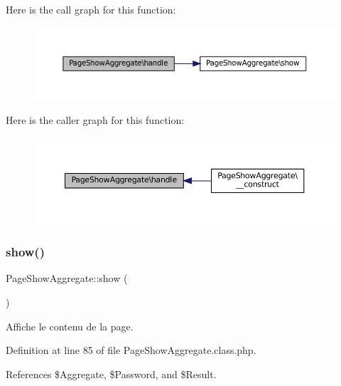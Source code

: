 Here is the call graph for this function\+:\nopagebreak
\begin{figure}[H]
\begin{center}
\leavevmode
\includegraphics[width=350pt]{class_page_show_aggregate_afc4bd6c13d8f52ef14bb372abe533db2_cgraph}
\end{center}
\end{figure}
Here is the caller graph for this function\+:\nopagebreak
\begin{figure}[H]
\begin{center}
\leavevmode
\includegraphics[width=350pt]{class_page_show_aggregate_afc4bd6c13d8f52ef14bb372abe533db2_icgraph}
\end{center}
\end{figure}
\mbox{\label{class_page_show_aggregate_aa314c7c81c17209770ea207979ca484e}} 
\subsubsection{\texorpdfstring{show()}{show()}}
{\footnotesize\ttfamily Page\+Show\+Aggregate\+::show (\begin{DoxyParamCaption}{ }\end{DoxyParamCaption})\hspace{0.3cm}{\ttfamily [protected]}}

Affiche le contenu de la page. 

Definition at line 85 of file Page\+Show\+Aggregate.\+class.\+php.



References \$\+Aggregate, \$\+Password, and \$\+Result.



